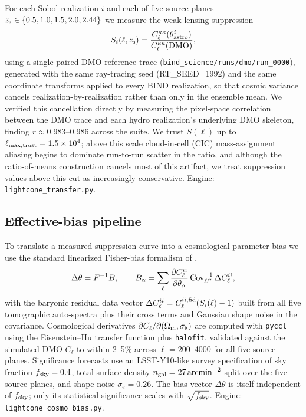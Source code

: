 \documentclass[11pt]{article}
\newcommand{\Sell}{S(\ell)}                    %
\newcommand{\zs}{z_{\rm s}}
\begin{document}
For each Sobol realization $i$ and each of five source planes
$\zs\in\{0.5,1.0,1.5,2.0,2.44\}$ we measure the weak-lensing suppression
\begin{equation}
S_i(\ell,\zs) = \frac{C_\ell^{\kappa\kappa}(\theta_{\rm astro}^i)}{C_\ell^{\kappa\kappa}({\rm DMO})} ,
\end{equation}
using a single paired DMO reference trace (\texttt{bind\_science/runs/dmo/run\_0000}),
generated with the same ray-tracing seed (RT\_SEED=1992) and the same coordinate
transforms applied to every BIND realization, so that cosmic variance cancels
realization-by-realization rather than only in the ensemble mean. We verified
this cancellation directly by measuring the pixel-space correlation between
the DMO trace and each hydro realization's underlying DMO skeleton, finding
$r\approx0.983$--$0.986$ across the suite. %
We trust $\Sell$ up to $\ell_{\rm max,trust}=1.5\times10^4$; above this scale
cloud-in-cell (CIC) mass-assignment aliasing begins to dominate run-to-run
scatter in the ratio, and although the ratio-of-means construction cancels
most of this artifact, we treat suppression values above this cut as
increasingly conservative. Engine: \texttt{lightcone\_transfer.py}.

\subsection{Effective-bias pipeline}\label{sec:fisherbias}

To translate a measured suppression curve into a cosmological parameter bias
we use the standard linearized Fisher-bias formalism of \citet{schneider2020fisher},
\begin{equation}
\Delta\theta = F^{-1} B, \qquad B_\alpha = \sum_{\ell} \frac{\partial C_\ell^{ii}}{\partial\theta_\alpha}\,{\rm Cov}^{-1}_{\ell\ell'}\,\Delta C_\ell^{ii},
\end{equation}
with the baryonic residual data vector $\Delta C_\ell^{ii} = C_\ell^{ii,{\rm fid}}(S_i(\ell)-1)$
built from all five tomographic auto-spectra plus their cross terms and Gaussian
shape noise in the covariance. Cosmological derivatives $\partial C_\ell/\partial(\Omega_{\rm m},\sigma_8)$
are computed with \texttt{pyccl} \citep[v3.3.4,][]{chisari2019} using the Eisenstein--Hu transfer
function plus \texttt{halofit}, validated against the simulated DMO $C_\ell$
to within 2--5\% across $\ell=200$--4000 for all five source planes. %
Significance forecasts use an LSST-Y10-like survey specification of sky
fraction $f_{\rm sky}=0.4$, total surface density $n_{\rm gal}=27\,{\rm arcmin}^{-2}$
split over the five source planes, and shape noise $\sigma_e=0.26$. %
The bias vector $\Delta\theta$ is itself independent of $f_{\rm sky}$; only its
statistical significance scales with $\sqrt{f_{\rm sky}}$. Engine:
\texttt{lightcone\_cosmo\_bias.py}.
\end{document}
